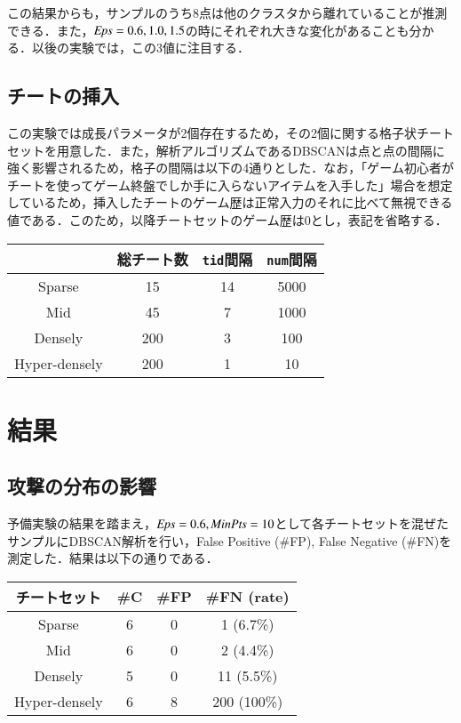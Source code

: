 この結果からも，サンプルのうち8点は他のクラスタから離れていることが推測できる．また，${\it Eps}=0.6, 1.0, 1.5$の時にそれぞれ大きな変化があることも分かる．以後の実験では，この3値に注目する．

\subsection{チートの挿入}
この実験では成長パラメータが2個存在するため，その2個に関する格子状チートセットを用意した．また，解析アルゴリズムであるDBSCANは点と点の間隔に強く影響されるため，格子の間隔は以下の4通りとした．なお，「ゲーム初心者がチートを使ってゲーム終盤でしか手に入らないアイテムを入手した」場合を想定しているため，挿入したチートのゲーム歴は正常入力のそれに比べて無視できる値である．このため，以降チートセットのゲーム歴は0とし，表記を省略する．

\begin{table}[htbp]
\begin{center}
\begin{tabular}{c|ccc}
& 総チート数 & {\tt tid}間隔 & {\tt num}間隔 \\
\hline
Sparse & 15 & 14 & 5000 \\
Mid & 45 & 7 & 1000 \\
Densely & 200 & 3 & 100 \\
Hyper-densely & 200 & 1 & 10
\end{tabular}
\end{center}
\end{table}

\section{結果}
\subsection{攻撃の分布の影響}
予備実験の結果を踏まえ，${\it Eps} = 0.6, {\it MinPts} = 10$として各チートセットを混ぜたサンプルにDBSCAN解析を行い，False Positive (\#FP), False Negative (\#FN)を測定した．結果は以下の通りである．

\begin{table}[htbp]
\begin{center}
\begin{tabular}{c|ccc}
チートセット & \#C & \#FP & \#FN (rate) \\ \hline
Sparse & 6 & 0 & 1 (6.7\%) \\
Mid & 6 & 0 & 2 (4.4\%) \\
Densely & 5 & 0 & 11 (5.5\%) \\
Hyper-densely & 6 & 8 & 200 (100\%)
\end{tabular}
\end{center}
\end{table}

